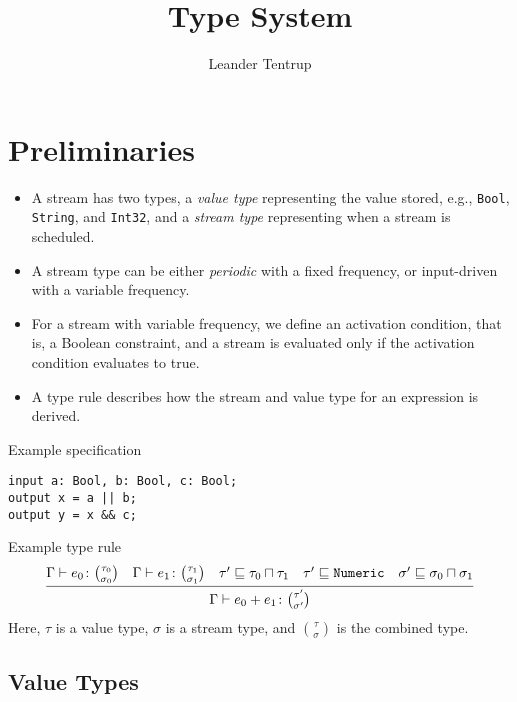 \documentclass{article}
\title{Type System}
\author{Leander Tentrup}
\newcommand{\type}[1]{\texttt{#1}}
\begin{document}
\maketitle

\section{Preliminaries}

\begin{itemize}
  \item A stream has two types, a \emph{value type} representing the value stored, e.g., \type{Bool}, \type{String}, and \type{Int32}, and a \emph{stream type} representing when a stream is scheduled.
  \item A stream type can be either \emph{periodic} with a fixed frequency, or input-driven with a variable frequency.
  \item For a stream with variable frequency, we define an activation condition, that is, a Boolean constraint, and a stream is evaluated only if the activation condition evaluates to true.
  \item A type rule describes how the stream and value type for an expression is derived.
\end{itemize}

\begin{framed}
Example specification
\begin{lstlisting}
input a: Bool, b: Bool, c: Bool;
output x = a || b;
output y = x && c;
\end{lstlisting}
\end{framed}

\begin{framed}
Example type rule
\begin{equation*}
  \infer
  {\Gamma \vdash e_0 + e_1 \colon \binom{\tau'}{\sigma'}}
  {\Gamma \vdash e_0 \colon \binom{\tau_0}{\sigma_0} & \Gamma \vdash e_1 \colon \binom{\tau_1}{\sigma_1} & \tau' \sqsubseteq \tau_0 \sqcap \tau_1 & \tau' \sqsubseteq \type{Numeric} & \sigma' \sqsubseteq \sigma_0 \sqcap \sigma_1}
\end{equation*}
Here, $\tau$ is a value type, $\sigma$ is a stream type, and $\binom{\tau}{\sigma}$ is the combined type.
\end{framed}

\subsection{Value Types}
\end{document}

